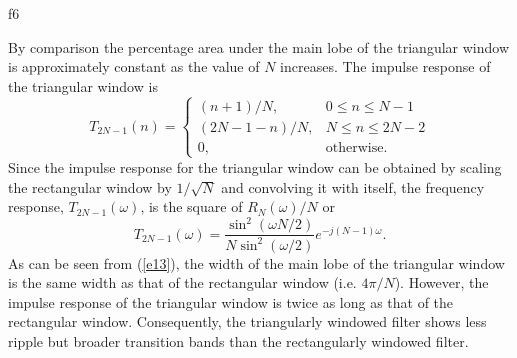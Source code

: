 %

{f6}
%


	By comparison the percentage area under the main lobe of 
the triangular window
 is
approximately constant as the value of $N$ increases.  
The impulse response of the triangular window is
%
\begin{equation}
T_{2N-1}(n)=
               \left\{ \begin{array}{ll}
                     (n+1)/N, & \mbox{$0\le n\le N-1$}\\
                     (2N-1-n)/N, & \mbox{$N\le n\le 2N-2$}\\
                     0, & \mbox{otherwise}.
                \end{array}
       \right.
\label{e12}
\end{equation}
%
Since the impulse response for the triangular window
can be obtained by scaling the rectangular window by $1/\sqrt{N}$
and convolving it with itself, the frequency response, $T_{2N-1}(\omega)$,
is the square of $R_N(\omega)/N$ or
%
\begin{equation}
T_{2N-1}(\omega)=\frac{\sin^2(\omega N/2)}{N\sin^2(\omega/2)}e^{-j(N-1)\omega}.
\label{e13}
\end{equation}
%
As can be seen from (\ref{e13}), the width of the main
lobe of the triangular window is the same width as that
of the rectangular window (i.e. $4\pi/N$).  However, the impulse response
of the triangular window is twice as long as that of the 
rectangular window.  Consequently, the triangularly
windowed filter shows less ripple but broader transition bands than
the rectangularly windowed filter.  

